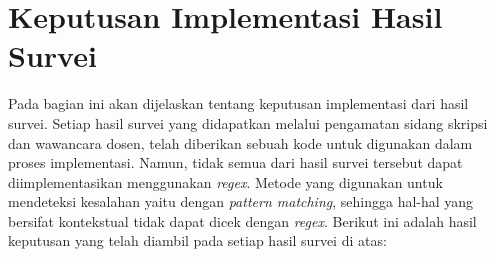 \begin{comment}
			\item Konsistensi penggunaan kata \\
			Kode implementasi: VAN-02 \\
			Mahasiswa harus konsisten dalam penulisan kata, misalnya kata\textit{user} dan pengguna.  Mahasiswa harus memilih antara memakai \textit{user} atau pengguna.
			
			\item Penggunaan kata ganti orang \\
			Kode implementasi: VAN-03 \\
			Dalam penulisan dokumen skripsi, tidak boleh ada kata ganti orang. Jika karya non-ilmiah lebih santai karena memakai gaya bahasa non-formal, maka berbeda dengan karya ilmiah. Karya ilmiah memiliki aturan baku dan menggunakan bahasa formal. 
			
		\end{itemize}
		
	\item Wawancara ke-5 dilakukan pada tanggal 16 Juli 2019.
	
		\begin{itemize}
			\item Penulisan daftar referensi \\
			Kode implementasi: NAT-01 \\ 
			Penulisan daftar referensi dibuat jika dalam tulisan ilmiah tersebut memang menggunakan kutipan atau rujukan dari orang lain. Kesalahan yang sering terjadi, yaitu tidak ditemukannya referensi yang akan digunakan. Pada teks yang akan dirujuk, akan terdapat tanda [?], seharusnya tanda tanya tersebut diisi oleh nomor dari referensi.
			
		\end{itemize}
		
\end{enumerate}
\end{comment}

\section{Keputusan Implementasi Hasil Survei}

Pada bagian ini akan dijelaskan tentang keputusan implementasi dari hasil survei. Setiap hasil survei yang didapatkan melalui pengamatan sidang skripsi dan wawancara dosen, telah diberikan sebuah kode untuk digunakan dalam proses implementasi. Namun, tidak semua dari hasil survei tersebut dapat diimplementasikan menggunakan \textit{regex}. Metode yang digunakan untuk mendeteksi kesalahan yaitu dengan \textit{pattern matching}, sehingga hal-hal yang bersifat kontekstual tidak dapat dicek dengan \textit{regex}. Berikut ini adalah hasil keputusan yang telah diambil pada setiap hasil survei di atas:

